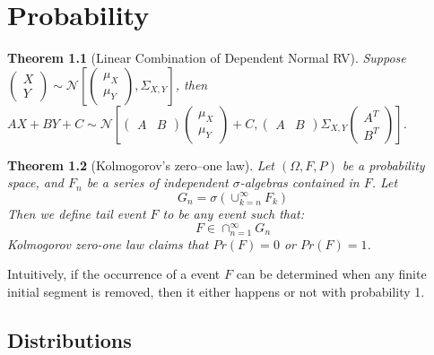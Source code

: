 \documentclass{book}
\theoremstyle{plain}
\newtheorem{thm}{Theorem}[section] %
\theoremstyle{definition}
\begin{document}








\chapter{Probability} %
\label{cha:probability}

\begin{thm}[Linear Combination of Dependent Normal RV]
Suppose \(\left(\begin{matrix}X\\Y \end{matrix}\right) \sim \mathcal{N}\left[ \left(\begin{matrix}\mu_X\\\mu_Y\end{matrix}\right), \Sigma_{X,Y} \right]\),
then
\(AX+BY+C \sim \mathcal{N}\left[ 
\left(\begin{matrix}A& B \end{matrix}\right)
\left(\begin{matrix}\mu_X\\\mu_Y\end{matrix}\right) + C, 
\left(\begin{matrix}A & B \end{matrix}\right)\Sigma_{X,Y} \left(\begin{matrix}A^T \\ B^T \end{matrix}\right)\right]\).
\end{thm}


\begin{thm}[Kolmogorov's zero–one law]
Let $(\Omega,F,P)$ be a probability space, and $F_n$ be a series of independent $\sigma$-algebras contained in $F$.
Let
\[G_n = \sigma \left( \cup^\infty_{k=n} F_k\right)\]
Then we define tail event $F$ to be any event such that:
\[F \in \cap^\infty_{n=1}G_n\]
Kolmogorov zero-one law claims that $Pr(F)=0$ or $Pr(F)=1$. 
\end{thm}

Intuitively, if the occurrence of a event $F$ can be determined when any finite initial segment is removed, then it either happens or not with probability 1.


\section{Distributions} %
\label{sec:distributions}
\end{document}
